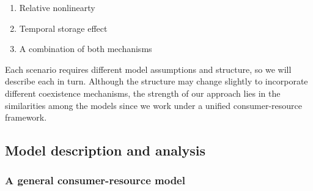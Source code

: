 \documentclass[12pt,]{article}
\begin{document}
\begin{enumerate}
  \item Relative nonlinearty
  \item Temporal storage effect
  \item A combination of both mechanisms
\end{enumerate}

Each scenario requires different model assumptions and structure, so we
will describe each in turn. Although the structure may change slightly
to incorporate different coexistence mechanisms, the strength of our
approach lies in the similarities among the models since we work under a
unified consumer-resource framework.

\subsection{Model description and
analysis}\label{model-description-and-analysis}

\subsubsection{A general consumer-resource
model}\label{a-general-consumer-resource-model}
\end{document}
